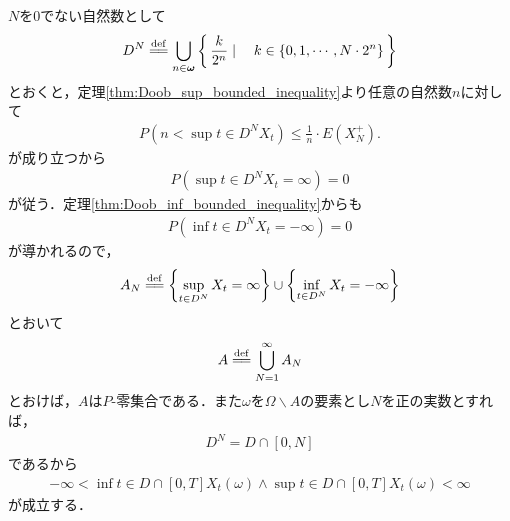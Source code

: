 	\begin{sketch}
		$N$を$0$でない自然数として
		\begin{align}
			D^N \defeq \bigcup_{n \in \Natural} \Set{\frac{k}{2^n}}{k \in \{0,1,\cdots,N \cdot 2^n\}}
		\end{align}
		とおくと，定理\ref{thm:Doob_sup_bounded_inequality}より任意の自然数$n$に対して
		\begin{align}
			P\left(n < \sup{t \in D^N}{X_t}\right)
			\leq \frac{1}{n} \cdot E\left(X_N^+\right).
		\end{align}
		が成り立つから
		\begin{align}
			P\left(\sup{t \in D^N}{X_t} = \infty\right) = 0
		\end{align}
		が従う．定理\ref{thm:Doob_inf_bounded_inequality}からも
		\begin{align}
			P\left(\inf{t \in D^N}{X_t} = -\infty\right) = 0
		\end{align}
		が導かれるので，
		\begin{align}
			A_N \defeq \left\{\sup{t \in D^N}{X_t} = \infty\right\} \cup \left\{\inf{t \in D^N}{X_t} = -\infty\right\}
		\end{align}
		とおいて
		\begin{align}
			A \defeq \bigcup_{N=1}^\infty A_N
		\end{align}
		とおけば，$A$は$P$-零集合である．また$\omega$を$\Omega \backslash A$の要素とし$N$を正の実数とすれば，
		\begin{align}
			D^N = D \cap [0,N]
		\end{align}
		であるから
		\begin{align}
			- \infty < \inf{t \in D \cap [0,T]}X_t(\omega) \wedge \sup{t \in D \cap [0,T]}X_t(\omega) < \infty
		\end{align}
		が成立する．
		\QED
	\end{sketch}
	
	